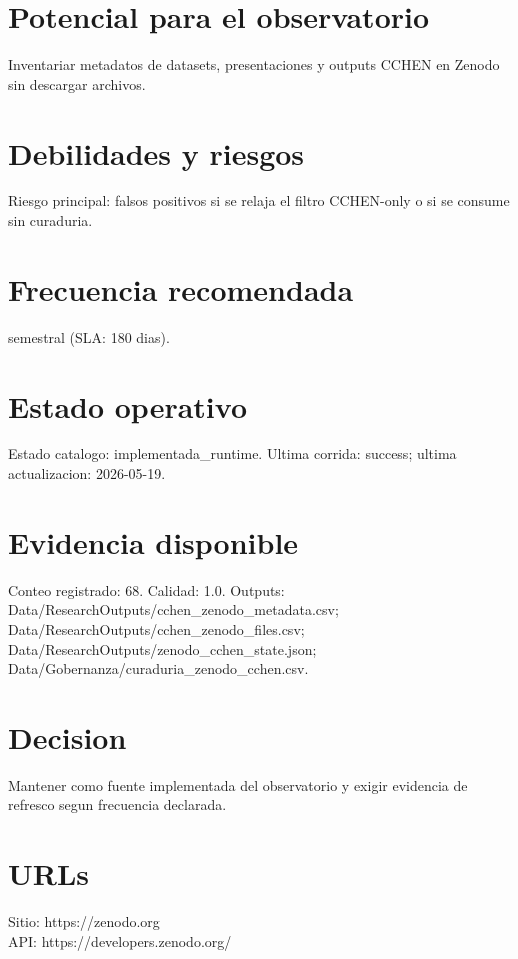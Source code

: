 \documentclass[10pt,a4paper]{article}
\begin{document}
\section*{Potencial para el observatorio}
Inventariar metadatos de datasets, presentaciones y outputs CCHEN en Zenodo sin descargar archivos.

\section*{Debilidades y riesgos}
Riesgo principal: falsos positivos si se relaja el filtro CCHEN-only o si se consume sin curaduria.

\section*{Frecuencia recomendada}
semestral (SLA: 180 dias).

\section*{Estado operativo}
Estado catalogo: implementada\_runtime. Ultima corrida: success; ultima actualizacion: 2026-05-19.

\section*{Evidencia disponible}
Conteo registrado: 68. Calidad: 1.0. Outputs: Data/ResearchOutputs/cchen\_zenodo\_metadata.csv; Data/ResearchOutputs/cchen\_zenodo\_files.csv; Data/ResearchOutputs/zenodo\_cchen\_state.json; Data/Gobernanza/curaduria\_zenodo\_cchen.csv.

\section*{Decision}
Mantener como fuente implementada del observatorio y exigir evidencia de refresco segun frecuencia declarada.


\section*{URLs}
Sitio: https://zenodo.org\\
API: https://developers.zenodo.org/
\end{document}
